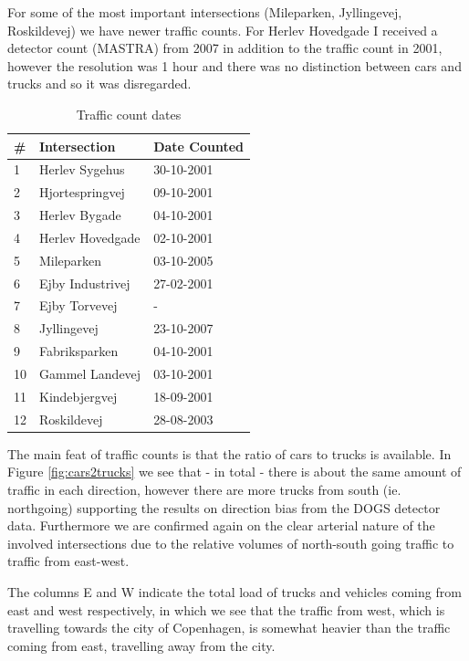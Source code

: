 For some of the most important intersections (Mileparken, Jyllingevej, Roskildevej) we have newer traffic counts. For Herlev Hovedgade I received a detector count (MASTRA) from 2007 in addition to the traffic count in 2001, however the resolution was 1 hour and there was no distinction between cars and trucks and so it was disregarded.

\begin{table}[!ht]
\centering
\begin{tabular}{l|l|l}
\textbf{\#} & \textbf{Intersection} & \textbf{Date Counted}\\ \hline
1 & Herlev Sygehus & 30-10-2001\\
2 & Hjortespringvej & 09-10-2001\\
3 & Herlev Bygade & 04-10-2001\\
4 & Herlev Hovedgade & 02-10-2001\\
5 & Mileparken & 03-10-2005\\
6 & Ejby Industrivej & 27-02-2001\\
7 & Ejby Torvevej & -\\
8 & Jyllingevej & 23-10-2007\\
9 & Fabriksparken & 04-10-2001\\
10 & Gammel Landevej & 03-10-2001\\
11 & Kindebjergvej & 18-09-2001\\
12 & Roskildevej & 28-08-2003\\
\end{tabular}
\caption{Traffic count dates}
\label{tab:traffic_counts}
\end{table}

The main feat of traffic counts is that the ratio of cars to trucks is available. In Figure \ref{fig:cars2trucks} we see that - in total - there is about the same amount of traffic in each direction, however there are more trucks from south (ie. northgoing) supporting the results on direction bias from the DOGS detector data. Furthermore we are confirmed again on the clear arterial nature of the involved intersections due to the relative volumes of north-south going traffic to traffic from east-west.

The columns E and W indicate the total load of trucks and vehicles coming from east and west respectively, in which we see that the traffic from west, which is travelling towards the city of Copenhagen, is somewhat heavier than the traffic coming from east, travelling away from the city.

